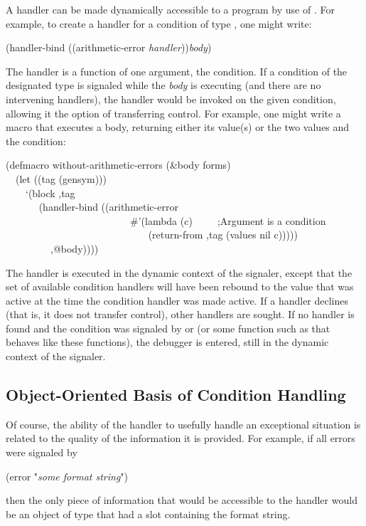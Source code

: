 A handler can be made dynamically accessible to a program by use of
. For example, to create a handler for a condition of type
, one might write:
\begingroup
\makeatletter
\def\@listi{\leftmargin\leftmargini \labelsep\leftmargin
   \parsep 3pt\relax
   \topsep 4pt plus 9pt\relax
   \itemsep\topsep}
\makeatother
\begin{lisp}
(handler-bind ((arithmetic-error \emph{handler}))\emph{body})
\end{lisp}
The handler is a function of one argument, the condition. If a condition of
the designated type is signaled while the \emph{body} is executing (and there are no
intervening handlers), the handler would be invoked on the given condition,
allowing it the option of transferring control. For example, one might write a
macro that executes a body, returning either its value(s) or the two values
 and the condition:
\begin{lisp}
(defmacro without-arithmetic-errors (\&body forms) \\
~~(let ((tag (gensym))) \\
~~~~`(block ,tag \\
~~~~~~ (handler-bind ((arithmetic-error \\
~~~~~~~~~~~~~~~~~~~~~~~~~\#'(lambda (c)~~~~~;\textrm{Argument  is a condition} \\
~~~~~~~~~~~~~~~~~~~~~~~~~~~~ (return-from ,tag (values nil c))))) \\
~~~~~~~~~,@body)))) \\
\end{lisp}
\endgroup
The handler is executed in the dynamic context of the signaler, except
that the set of available condition handlers will have been rebound to
the value that was active at the time the condition handler was made
active. If a handler declines (that is, it does not transfer control), other 
handlers are sought. If no handler is found and the condition was signaled
by  or  (or some function such as  that behaves like
these functions), the debugger is entered, still in the dynamic context 
of the signaler.

\subsection{Object-Oriented Basis of Condition Handling}
\label{OBJECT-0RIENTED-BASIS}

Of course, the ability of the handler to usefully handle an exceptional
situation is related to the quality of the information it is provided. For
example, if all errors were signaled by
\begin{lisp}
(error "\emph{some format string}")
\end{lisp}
then the only piece of information that would be accessible to the handler
would be an object of type  that had a slot containing the
format string.

